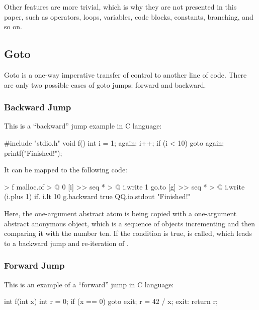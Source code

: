 \documentclass[sigplan,nonacm]{acmart}
\begin{document}
Other features are more trivial, which is why they are not presented in this paper, such as operators, loops, variables, code blocks, constants, branching, and so on.

\subsection{Goto}
\label{sec:goto}

Goto is a one-way imperative transfer of control to another line of code. There are only two possible cases of goto jumps: forward and backward.

\subsubsection{Backward Jump}

This is a ``backward'' jump example in C language:

\begin{ffcode}
#include "stdio.h"
void f() {
  int i = 1;
  again:
  i++;
  if (i < 10) goto again;
  printf("Finished!");
}
\end{ffcode}

It can be mapped to the following \eolang{} code:

\begin{ffcode}
[] > f
  malloc.of > @
    0
    [i] >>
      seq * > @
        i.write 1
        go.to
          [g] >>
            seq * > @
              i.write (i.plus 1)
              if.
                i.lt 10
                g.backward
                true
        QQ.io.stdout "Finished!"
\end{ffcode}

Here, the one-argument abstract atom  is being copied with a one-argument abstract anonymous object, which is a sequence of objects incrementing  and then comparing it with the number ten. If the condition is true,  is called, which leads to a backward jump and re-iteration of .

\subsubsection{Forward Jump}

This is an example of a ``forward'' jump in C language:

\begin{ffcode}
int f(int x) {
  int r = 0;
  if (x == 0) goto exit;
  r = 42 / x;
  exit:
  return r;
}
\end{ffcode}
\end{document}

